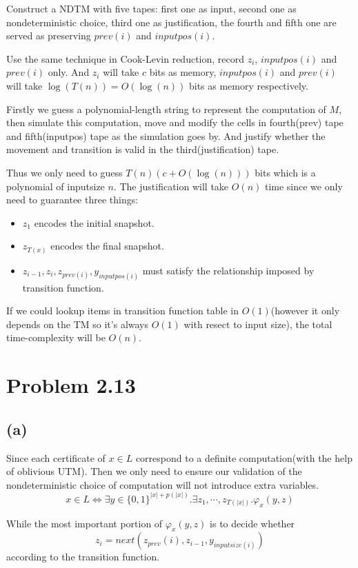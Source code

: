 \documentclass[paper=a4, fontsize=11pt]{scrartcl} %
\numberwithin{equation}{section} %
\numberwithin{figure}{section} %
\numberwithin{table}{section} %
\begin{document}
Construct a NDTM with five tapes: first one as input, second one as nondeterministic choice, third one as justification, the fourth and fifth one are served as preserving $\textit{prev}(i)$ and $\textit{inputpos}(i)$.

Use the same technique in Cook-Levin reduction, record $z_i$, $\textit{inputpos}(i)$ and $\textit{prev}(i)$ only. And $z_i$ will take $c$ bits as memory, $\textit{inputpos}(i)$ and $\textit{prev}(i)$ will take $\log(T(n)) = O(\log(n))$ bits as memory respectively.

Firstly we guess a polynomial-length string to represent the computation of $M$, then simulate this computation, move and modify the cells in fourth(prev) tape and fifth(inputpos) tape as the simulation goes by. And justify whether the movement and transition is valid in the third(justification) tape.

Thus we only need to guess $T(n)(c + O(\log(n)))$ bits which is a polynomial of inputsize $n$. The justification will take $O(n)$ time since we only need to guarantee three things: 
\begin{itemize}
	\item $z_1$ encodes the initial snapshot.
	\item $z_{T(x)}$ encodes the final snapshot.
	\item $z_{i-1}, z_i, z_{\textit{prev}(i)}, y_{\textit{inputpos}(i)}$ must satisfy the relationship imposed by transition function.
\end{itemize}

If we could lookup items in transition function table in $O(1)$(however it only depends on the TM so it's always $O(1)$ with resect to input size), the total time-complexity will be $O(n)$.

\section*{Problem 2.13}
\subsection*{(a)}
Since each certificate of $x\in L$ correspond to a definite computation(with the help of oblivious UTM). Then we only need to ensure our validation of the nondeterministic choice of computation will not introduce extra variables. 
$$x\in L \iff \exists y \in \{0, 1\}^{|x| + p(|x|)}. \exists z_1, \cdots, z_{T(|x|)}. \varphi_x(y, z) $$

While the most important portion of $\varphi_x(y, z)$ is to decide whether $$ z_i = \textit{next}(z_{\textit{prev}}(i), z_{i-1}, y_{\textit{inputsize}(i)})$$ according to the transition function.
\end{document}
